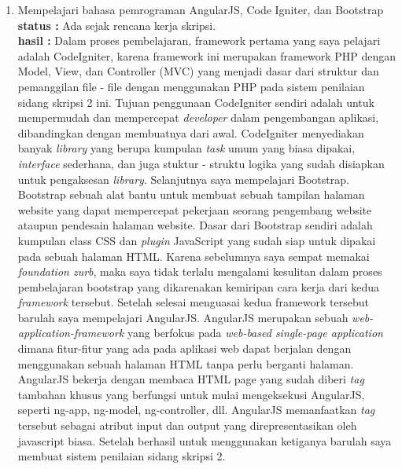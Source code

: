 \documentclass[a4paper,twoside]{article}
\begin{document}
\begin{enumerate}
		\item Mempelajari bahasa pemrograman AngularJS, Code Igniter, dan Bootstrap\\
		{\bf status :} Ada sejak rencana kerja skripsi.\\
		{\bf hasil :} Dalam proses pembelajaran, framework pertama yang saya pelajari adalah CodeIgniter, karena framework ini merupakan framework PHP dengan Model, View, dan Controller (MVC) yang menjadi dasar dari struktur dan pemanggilan file - file dengan menggunakan PHP pada sistem penilaian sidang skripsi 2 ini. Tujuan penggunaan CodeIgniter sendiri adalah untuk mempermudah dan mempercepat \textit{developer} dalam pengembangan aplikasi, dibandingkan dengan membuatnya dari awal. CodeIgniter menyediakan banyak \textit{library} yang berupa kumpulan \textit{task} umum yang biasa dipakai, \textit{interface} sederhana, dan juga stuktur - struktu logika yang sudah disiapkan untuk pengaksesan \textit{library}.
		Selanjutnya saya mempelajari Bootstrap. Bootstrap sebuah alat bantu untuk membuat sebuah tampilan halaman website yang dapat mempercepat pekerjaan seorang pengembang website ataupun pendesain halaman website. Dasar dari Bootstrap sendiri adalah kumpulan class CSS dan \textit{plugin} JavaScript yang sudah siap untuk dipakai pada sebuah halaman HTML. Karena sebelumnya saya sempat memakai \textit{foundation zurb}, maka saya tidak terlalu mengalami kesulitan dalam proses pembelajaran bootstrap yang dikarenakan kemiripan cara kerja dari kedua \textit{framework} tersebut.
		Setelah selesai menguasai kedua framework tersebut barulah saya mempelajari AngularJS. AngularJS merupakan sebuah \textit{web-application-framework} yang berfokus pada \textit{web-based single-page application} dimana fitur-fitur yang ada pada aplikasi web dapat berjalan dengan menggunakan sebuah halaman HTML tanpa perlu berganti halaman. AngularJS bekerja dengan membaca HTML page yang sudah diberi \textit{tag} tambahan khusus yang berfungsi untuk mulai mengeksekusi AngularJS, seperti ng-app, ng-model, ng-controller, dll. AngularJS memanfaatkan \textit{tag} tersebut sebagai atribut input dan output yang direpresentasikan oleh javascript biasa. 
		Setelah berhasil untuk menggunakan ketiganya barulah saya membuat sistem penilaian sidang skripsi 2.


\end{enumerate}
\end{document}
